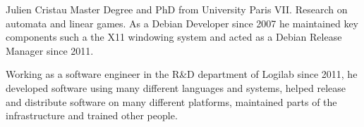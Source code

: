 \begin{participant}[type=PI,PM=10]{Julien Cristau}
  Master Degree and PhD from University Paris VII. Research on 
  automata and linear games. As a Debian Developer since 2007 he
  maintained key components such a the X11 windowing system and
  acted as a Debian Release Manager since 2011.
  
  Working as a software engineer in the R\&D department of Logilab since
  2011, he developed software using many different languages and systems,
  helped release and distribute software on many different platforms,
  maintained parts of the infrastructure and trained other people.
\end{participant}
